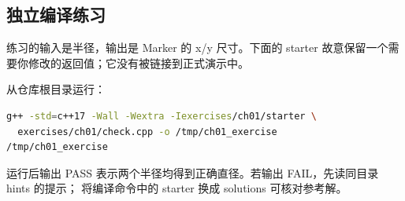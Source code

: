 \subsection*{独立编译练习}
练习的输入是半径，输出是 Marker 的 x/y 尺寸。下面的 starter 故意保留一个需要你修改的返回值；它没有被链接到正式演示中。

从仓库根目录运行：
\begin{lstlisting}[language=bash,numbers=none]
g++ -std=c++17 -Wall -Wextra -Iexercises/ch01/starter \
  exercises/ch01/check.cpp -o /tmp/ch01_exercise
/tmp/ch01_exercise
\end{lstlisting}
运行后输出 PASS 表示两个半径均得到正确直径。若输出 FAIL，先读同目录 hints 的提示；
将编译命令中的 starter 换成 solutions 可核对参考解。
